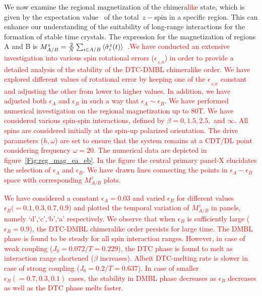 \documentclass[12pt]{iopart}
\newcommand{\red}[1]{\textcolor{red}{#1}}
\begin{document}
We now examine the regional magnetization of the chimera\red{like} state, which is given by the expectation value  of the total $z-$spin in a specific region. This can enhance our understanding of the suitability of long-range interactions for the formation of stable time crystals. The expression for the magnetization of regions A and B is $M^z_{A/B}=\frac{2}{N}\sum_{i\in{A/B}}\expval{\hat{\sigma}^z_i(t)}$~\cite{sakurai_phys_nodate}.\red{We have conducted an extensive investigation into various spin rotational errors ($\epsilon_{_{A,B}}$) in order to provide a detailed analysis of the stability of the DTC-DMBL chimeralike order. We have explored different values of rotational error by keeping one of the $\epsilon_{_{A/B}}$ constant and adjusting the other from lower to higher values. In addition, we have adjusted both $\epsilon_A$ and $\epsilon_B$ in such a way that $\epsilon_A \sim \epsilon_B$. We have performed  numerical investigation on the regional magnetization up to 80T. We have  considered various spin-spin interactions, defined by $\beta = 0,1.5,2.5,$ and $\infty$. All spins are considered initially at the spin-up polarized orientation. The drive parameters ($h,\omega$) are set to ensure that the system remains at a CDT/DL point considering frequency $\omega =20$. The numerical data are depicted in figure~\ref{Fig:reg_mag_ea_eb}. In the figure the central primary panel-X elucidates the selection of $\epsilon_A$ and $\epsilon_B$. We have drawn lines connecting the points in $\epsilon_A - \epsilon_B$ space with corresponding $M^z_{A/B}$ plots. }
	
\red{We have considered a constant $\epsilon_{A} =0.03$ and varied $\epsilon_B$ for different values $\epsilon_B(= 0.1, 0.3, 0.7,0.9$) and plotted the temporal variation of $M^z_{A/B}$ in panels, namely `d',`c',`b',`a' respectively. We observe that when $\epsilon_B$ is sufficiently large ($\epsilon_B=0.9$), the DTC-DMBL chimeralike order persists for large time. The DMBL phase is found to be steady for all spin interaction ranges. However, in case of weak coupling ($J_0=0.072/T=0.229$), the DTC phase is found to melt as interaction range shortened ($\beta$ increases). Albeit DTC-melting rate is slower in case of strong coupling ($J_0=0.2/T=0.637$). In case of smaller $\epsilon_B (=0.7,0.3,0.1)$ cases, the stability in DMBL phase decreases as $\epsilon_B$ decreases as well as  the DTC phase melts faster.}
\end{document}
